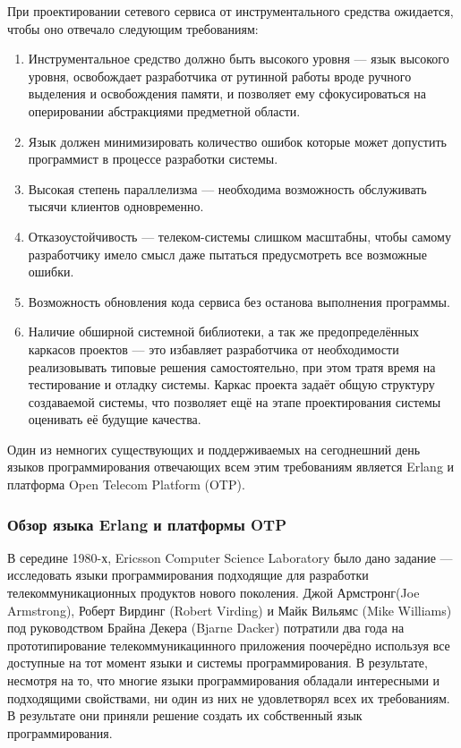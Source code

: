 При проектировании сетевого сервиса от инструментального средства ожидается, чтобы оно
отвечало следующим требованиям\cite{technob}:

\begin{enumerate}
	\item{} Инструментальное средство должно быть высокого уровня --- язык высокого уровня,
            освобождает разработчика от рутинной работы вроде ручного выделения и освобождения
            памяти, и позволяет ему сфокусироваться на оперировании абстракциями предметной области.
	\item{} Язык должен минимизировать количество ошибок которые может допустить программист в
             процессе разработки системы.
	\item{} Высокая степень параллелизма --- необходима возможность обслуживать тысячи клиентов
            одновременно.
	\item{} Отказоустойчивость --- телеком-системы слишком масштабны, чтобы самому разработчику
             имело смысл даже пытаться предусмотреть все возможные ошибки.
	\item{} Возможность обновления кода сервиса без останова выполнения программы.
	\item{} Наличие обширной системной библиотеки,  а так же предопределённых каркасов
            проектов --- это избавляет разработчика от необходимости реализовывать типовые
            решения самостоятельно, при этом тратя время на тестирование и отладку системы.
            Каркас проекта задаёт общую структуру создаваемой системы, что позволяет ещё
            на этапе проектирования системы оценивать её будущие качества.
\end{enumerate}

\begin{par}
Один из немногих существующих и поддерживаемых на сегоднешний день языков программирования
отвечающих всем этим требованиям является Erlang и платформа Open Telecom Platform (OTP).
\end{par}

\subsubsection{Обзор языка Erlang и платформы OTP}

\begin{par}
В середине 1980-х, Ericsson Computer Science Laboratory было дано задание --- исследовать языки программирования подходящие для разработки телекоммуникационных продуктов нового поколения. Джой Армстронг(Joe Armstrong), Роберт Вирдинг (Robert Virding) и Майк Вильямс (Mike Williams) под руководством Брайна Декера (Bjarne Dacker) потратили два года на прототипирование телекоммуникацинного приложения поочерёдно  используя все доступные на тот момент языки и системы программирования. В результате, несмотря на то, что многие языки программирования обладали интересными и подходящими свойствами, ни один из них не удовлетворял всех их требованиям. В результате они приняли решение создать их собственный язык программирования.
\end{par}

